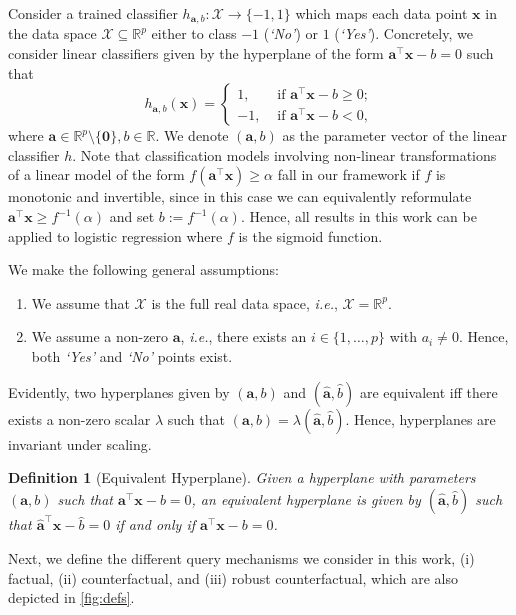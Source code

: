 \documentclass{article}
\newtheorem{definition}[theorem]{Definition}
\begin{document}
Consider a trained classifier $h_{\bm{a},b}: \mathcal X \to \{-1,1\}$ which maps each data point $\bm{x}$ in the data space $\mathcal X\subseteq\mathbb{R}^p$ either to class $-1$ (\textit{`No'}) or $1$ (\textit{`Yes'}). Concretely, we consider linear classifiers given by the hyperplane of the form $\bm{a}^\top \bm{x} -b = 0$ such that
\[
h_{\bm{a},b} (\bm{x}) = \begin{cases}
    1, & \text{ if } \bm{a}^\top \bm{x} - b\ge 0; \\
    -1, & \text{ if } \bm{a}^\top \bm{x} - b< 0,
\end{cases}
\]
where $\bm{a}\in\mathbb{R}^p\setminus\{\bm{0}\}, b\in\mathbb{R}$. We denote $(\bm{a},b)$ as the parameter vector of the linear classifier $h$. Note that classification models involving non-linear transformations of a linear model of the form $f(\bm{a}^\top \bm{x})\ge \alpha$ fall in our framework if $f$ is monotonic and invertible, since in this case we can equivalently reformulate $\bm{a}^\top \bm{x} \ge f^{-1}(\alpha)$ and set $b:=f^{-1}(\alpha)$. Hence, all results in this work can be applied to logistic regression where $f$ is the sigmoid function.

We make the following general assumptions:
\begin{enumerate}
    \item[(A1)] We assume that $\mathcal{X}$ is the full real data space, \textit{i.e.}, $\mathcal{X}=\mathbb{R}^p$.
    \item[(A2)] We assume a non-zero $\bm{a}$, \textit{i.e.}, there exists an $i \in \{ 1,\ldots ,p\}$ with $a_i\neq 0$. Hence, both \textit{`Yes'}  and \textit{`No'} points exist. 
\end{enumerate}


Evidently, two hyperplanes given by $(\bm{a},b)$ and $(\hat{\bm{a}},\hat b)$ are equivalent iff there exists a non-zero scalar $\lambda$ such that $(\bm{a},b) = \lambda (\hat{\bm{a}}, \hat b)$. Hence, hyperplanes are invariant under scaling. 

\begin{definition}
[Equivalent Hyperplane]
Given a hyperplane with parameters $(\bm{a},b)$ such that $\bm{a}^\top \bm{x} -b = 0$, an equivalent hyperplane is given by $(\hat{\bm{a}},\hat b)$ such that $\hat{\bm{a}}^\top \bm{x}-\hat b=0$ if and only if $\bm{a}^\top \bm{x} -b = 0$.
\end{definition}

Next, we define the different query mechanisms we consider in this work, (i) factual, (ii) counterfactual, and (iii) robust counterfactual, which are also depicted in \cref{fig:defs}.
\end{document}

